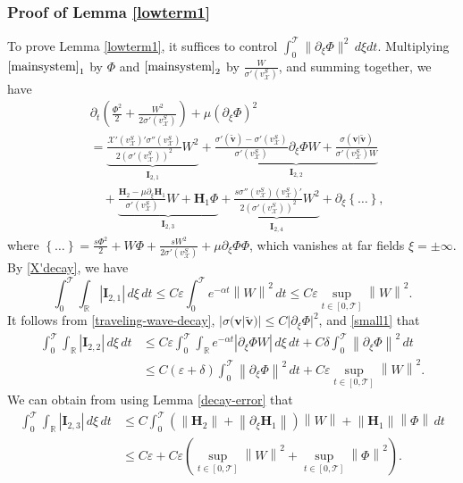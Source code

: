 \documentclass[12pt,reqno]{amsart}
\numberwithin{equation}{section}
\newcommand{\norm}[1]{\left\lVert #1 \right\rVert}
\newcommand{\subeqref}[2]{$ \eqref{#1}_{#2} $}
\def\p{\partial}
\def\R{\mathbb{R}}
\def\T{\mathcal{T}}
\def\supt{\mathop{sup}\limits_{t \in [0,\mathcal{T}]}}
\def\vsx{v^S_{\mathcal{X}}}
\def\X{\mathcal{X}}
\begin{document}
\subsubsection{Proof of Lemma \ref{lowterm1}}\label{pflow1}
To prove Lemma \ref{lowterm1}, it suffices to control $\int_{0}^{\T}\|\p_\xi\Phi\|^2\,d\xi dt$. Multiplying \subeqref{mainsystem}{1} by $\Phi$ and  \subeqref{mainsystem}{2} by $\frac{W}{\sigma'(\vsx)}$, and summing together,
we have
\begin{equation}\label{lowlemma}
	\begin{aligned}
		&\p_t\left(\frac{\Phi^2}{2}+\frac{W^2}{2\sigma'(\vsx)}\right)+\mu(\p_{\xi}\Phi)^2\\
		&=\underbrace{\frac{\X'(\vsx)'\sigma''(\vsx)}{2(\sigma'(\vsx))^2}W^2}_{\mathbf{I}_{2,1}}+\underbrace{\frac{\sigma'(\mathbf{\tilde{v}})-\sigma'(\vsx)}{\sigma'(\vsx)}\p_{\xi}\Phi W+\frac{\sigma(\mathbf{v}|\mathbf{\tilde{v}})}{\sigma'(\vsx)W}}_{\mathbf{I}_{2,2}}\\
		&\quad+\underbrace{\frac{\mathbf{H}_2-\mu\p_{\xi}\mathbf{H}_1}{\sigma'(\vsx)}W+\mathbf{H}_1\Phi}_{\mathbf{I}_{2,3}}+\underbrace{\frac{s\sigma''(\vsx)(\vsx)'}{2(\sigma'(\vsx))^2}W^2}_{\mathbf{I}_{2,4}}+\p_{\xi}\left\{\dots\right\},
	\end{aligned}
\end{equation}
where $\left\{\dots\right\}=\frac{s\Phi^2}{2}+W\Phi+\frac{sW^2}{2\sigma'(\vsx)}+\mu\p_{\xi}\Phi\Phi$, which vanishes at far fields $\xi=\pm\infty$. By \eqref{X'decay}, we have
\begin{equation}\label{low1}
	\int_{0}^{\T} \int_{\R} |{\mathbf{I}_{2,1}}| \,d\xi\,dt \leq C\varepsilon\int_{0}^{\T} e^{-\alpha t}\norm{W}^2 \,dt\leq C\varepsilon\supt\norm{W}^2.
\end{equation}
It follows from \eqref{traveling-wave-decay},  $|\sigma(\mathbf{v}|\mathbf{\tilde{v}})|\leq C|\p_{\xi}\Phi|^2$, and \eqref{small1} that
\begin{equation}\label{I2.1}
	\begin{aligned}
		\int_{0}^{\T} \int_{\R}|\mathbf{I}_{2,2}| \,d\xi  \,dt&\leq C\varepsilon\int_{0}^{\T}\int_{\R} e^{-\alpha t}|\p_{\xi}\Phi W| \,d\xi\,dt +C\delta\int_{0}^{\T}\norm{\p_{\xi}\Phi}^2\,dt\\
		&\leq C(\varepsilon+\delta)\int_{0}^{\T}\norm{\p_{\xi}\Phi}^2\,dt+C\varepsilon\supt\norm{W}^2.
	\end{aligned}
\end{equation}
We can obtain from using Lemma \ref{decay-error} that
\begin{equation}\label{I2.2}
	\begin{aligned}
		\int_{0}^{\T} \int_{\R}|\mathbf{I}_{2,3}|  \,d\xi  \,dt&\leq C\int_{0}^{\T}(\norm{\mathbf{H}_2}+\norm{\p_{\xi}\mathbf{H}_1})\norm{W}+\norm{\mathbf{H}_1}\norm{\Phi}  \,dt \\
		&\leq C\varepsilon+C\varepsilon(\supt\norm{W}^2+\supt\norm{\Phi}^2).
	\end{aligned}
\end{equation}
\end{document}
